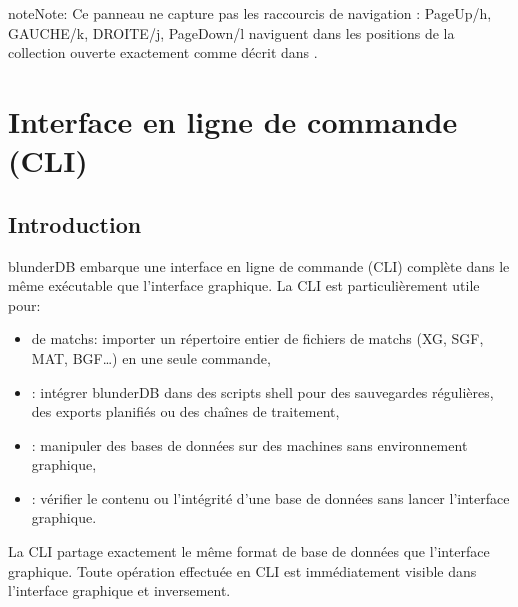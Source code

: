 \documentclass[letterpaper,10pt,french]{sphinxmanual}
\begin{document}
\begin{sphinxadmonition}{note}{Note:}
\sphinxAtStartPar
Ce panneau ne capture pas les raccourcis de navigation :
PageUp/h, GAUCHE/k, DROITE/j, PageDown/l naviguent dans les positions de
la collection ouverte exactement comme décrit dans
{\hyperref[\detokenize{raccourcis:raccourcis-navigation}]{}}.
\end{sphinxadmonition}

\sphinxstepscope


\section{Interface en ligne de commande (CLI)}
\label{\detokenize{cli:interface-en-ligne-de-commande-cli}}\label{\detokenize{cli:cli}}\label{\detokenize{cli::doc}}

\subsection{Introduction}
\label{\detokenize{cli:introduction}}
\sphinxAtStartPar
blunderDB embarque une interface en ligne de commande (CLI) complète dans le
même exécutable que l’interface graphique. La CLI est particulièrement utile
pour:
\begin{itemize}
\item {} 
\sphinxAtStartPar
{} de matchs: importer un répertoire entier de fichiers
de matchs (XG, SGF, MAT, BGF…) en une seule commande,

\item {} 
\sphinxAtStartPar
{}: intégrer blunderDB dans des scripts shell pour des
sauvegardes régulières, des exports planifiés ou des chaînes de traitement,

\item {} 
\sphinxAtStartPar
{}: manipuler des bases de données sur des machines
sans environnement graphique,

\item {} 
\sphinxAtStartPar
{}: vérifier le contenu ou l’intégrité d’une base de
données sans lancer l’interface graphique.

\end{itemize}

\sphinxAtStartPar
La CLI partage exactement le même format de base de données que l’interface
graphique. Toute opération effectuée en CLI est immédiatement visible dans
l’interface graphique et inversement.
\end{document}
